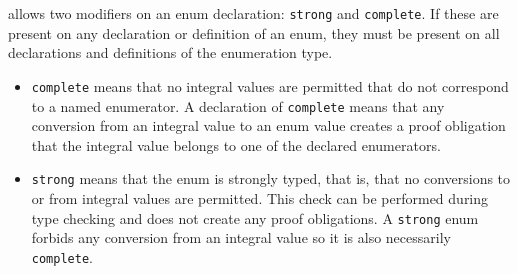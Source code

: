 \NAME allows two modifiers on an enum declaration: \lstinline|strong| and \lstinline|complete|. If these are present on any declaration or definition of an enum, they must be present on all declarations and definitions of the enumeration type.
\begin{itemize}
	\item \lstinline|complete| means that no integral values are permitted that do not correspond to a named enumerator. A declaration of \lstinline|complete| means that any conversion from an integral value to an enum value 
	creates a proof obligation that the integral value belongs to one of the declared enumerators.
	\item \lstinline|strong| means that the enum is strongly
	typed, that is, that no conversions to or from integral
	values are permitted. This check can be performed during
	type checking and does not create any proof obligations.
	A \lstinline|strong| enum forbids any conversion from an integral value
	so it is also necessarily \lstinline|complete|.
\end{itemize}
